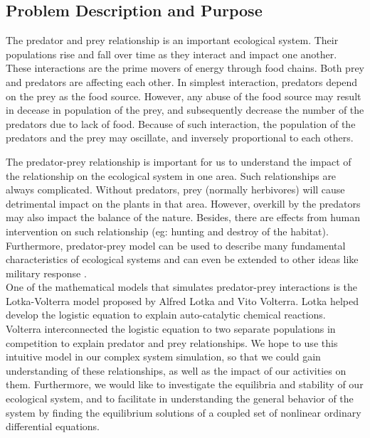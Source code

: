 \documentclass{article}
\begin{document}
\begin{normalsize}
		
		\section{Problem Description and Purpose}
		The predator and prey relationship is an important ecological system. Their populations rise and fall over time as they interact and impact one another. These interactions are the prime movers of energy through food chains. Both prey and predators are affecting each other. \cite{laham_2012_a}In simplest interaction, predators depend on the prey as the food source. However, any abuse of the food source may result in decease in population of the prey, and subsequently decrease the number of the predators due to lack of food. Because of such interaction, the population of the predators and the prey may oscillate, and inversely proportional to each others.\cite{obaid_2013_the}\
		
		The predator-prey relationship is important for us to understand the impact of the relationship on the ecological system in one area. Such relationships are always complicated. Without predators, prey (normally herbivores) will cause detrimental impact on the plants in that area. However, overkill by the predators may also impact the balance of the nature. Besides, there are effects from human intervention on such relationship (eg: hunting and destroy of the habitat). Furthermore, predator-prey model can be used to describe many fundamental characteristics of ecological systems and can even be extended to other ideas like military response \cite{derrik}.\\
		
		One of the mathematical models that simulates predator-prey interactions is the Lotka-Volterra model proposed by Alfred Lotka and Vito Volterra. Lotka helped develop the logistic equation to explain auto-catalytic chemical reactions. Volterra interconnected the logistic equation to two separate populations in competition to explain predator and prey relationships. We hope to use this intuitive model in our complex system simulation, so that we could gain understanding of these relationships, as well as the impact of our activities on them. Furthermore, we would like to investigate the equilibria and stability of our ecological system, and to facilitate in understanding the general behavior of the system by finding the equilibrium solutions of a coupled set of nonlinear ordinary differential equations.\cite{tung_2007_topics}\cite{a2018_alfred}

\end{normalsize}
\end{document}
